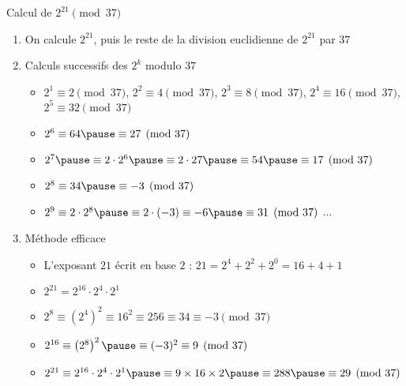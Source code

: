 \begin{frame}
  
\begin{exemple}
Calcul de $2^{21} \pmod {37}$

\pause

\begin{enumerate}
  \item On calcule $2^{21}$, puis le reste de la division euclidienne de $2^{21}$ par $37$

\pause

  \item Calculs successifs des $2^k$ modulo $37$ 

\pause

\begin{itemize}
  \item $2^1 \equiv 2 \pmod {37}$, \pause $2^2 \equiv 4 \pmod {37}$, \pause $2^3 \equiv 8 \pmod {37}$, \pause $2^4 \equiv 16 \pmod {37}$,
\pause $2^5 \equiv 32 \pmod {37}$
\pause
  \item $2^6 \equiv 64 \pause \equiv 27 \pmod {37}$
\pause
  \item $2^7 \pause \equiv 2 \cdot 2^6 \pause \equiv 2 \cdot 27 \pause \equiv 54 \pause \equiv 17 \pmod {37}$
\pause
  \item $2^{8} \equiv 34 \pause \equiv -3 \pmod {37}$
\pause
  \item $2^9 \equiv 2 \cdot 2^8 \pause \equiv 2 \cdot(-3) \equiv -6 \pause \equiv 31 \pmod{37}$ \quad ...
\end{itemize}

\pause

  \item Méthode efficace
\begin{itemize}
\pause
  \item L'exposant $21$ écrit en base $2$ : $21 = 2^{4} + 2^{2} + 2^{0} = 16 + 4 + 1$
\pause
  \item $2^{21} =  2^{16} \cdot 2^{4} \cdot 2^{1}$
\pause
  \item $2^8 \equiv  (2^4)^2 \equiv 16^2 \equiv 256 \equiv 34 \equiv -3 \pmod {37}$
\pause
  \item $2^{16} \equiv  \left(2^{8}\right)^2 \pause \equiv (-3)^2 \equiv 9 \pmod{37}$
\pause
  \item $2^{21} \equiv  2^{16} \cdot 2^{4} \cdot 2^{1} \pause \equiv 9 \times 16 \times 2 
\pause \equiv 288 \pause \equiv 29 \pmod {37}$
\end{itemize}

\end{enumerate}
\end{exemple}
\end{frame}


